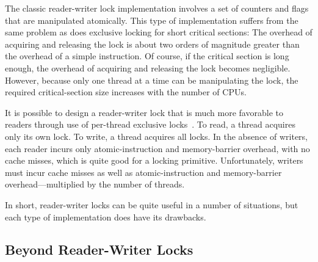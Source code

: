 The classic reader-writer lock implementation involves a set of
counters and flags that are manipulated atomically.
This type of implementation suffers from the same problem as does
exclusive locking for short critical sections: The overhead of acquiring
and releasing the lock
is about two orders of magnitude greater than the overhead
of a simple instruction.
Of course, if the critical section is long enough, the overhead of
acquiring and releasing the lock becomes negligible.
However, because only
one thread at a time can be manipulating the lock, the required
critical-section size increases with the number of CPUs.

It is possible to design a reader-writer lock that is much more
favorable to readers through use of per-thread exclusive
locks~\cite{WilsonCHsieh92a}.
To read, a thread acquires only its own lock.
To write, a thread acquires all locks.
In the absence of writers, each reader incurs only atomic-instruction
and memory-barrier overhead, with no cache misses, which is quite
good for a locking primitive.
Unfortunately, writers must incur cache misses as well as atomic-instruction
and memory-barrier overhead---multiplied by the number of threads.

In short, reader-writer locks can be quite useful in a number of
situations, but each type of implementation does have its drawbacks.

\subsection{Beyond Reader-Writer Locks}
\label{sec:locking:Beyond Reader-Writer Locks}

